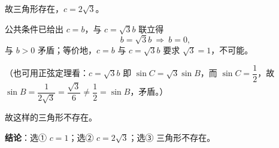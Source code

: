 \begin{answer}
故三角形存在，$c=2\sqrt3$。


公共条件已给出 $c=b$，与 $c=\sqrt3b$ 联立得
\nopagebreak[4]
\[b=\sqrt3b\ \Longrightarrow\ b=0,\]
与 $b>0$ 矛盾；等价地，$c=b$ 与 $c=\sqrt3b$ 要求 $\sqrt3=1$，不可能。

（也可用正弦定理看：$c=\sqrt3b$ 即 $\sin C=\sqrt3\sin B$，而 $\sin C=\dfrac12$，故 $\sin B=\dfrac1{2\sqrt3}=\dfrac{\sqrt3}6\ne\dfrac12=\sin B$，矛盾。）

故这样的三角形不存在。

\textbf{结论}：选① $c=1$；选② $c=2\sqrt3$；选③ 三角形不存在。


\end{answer}
